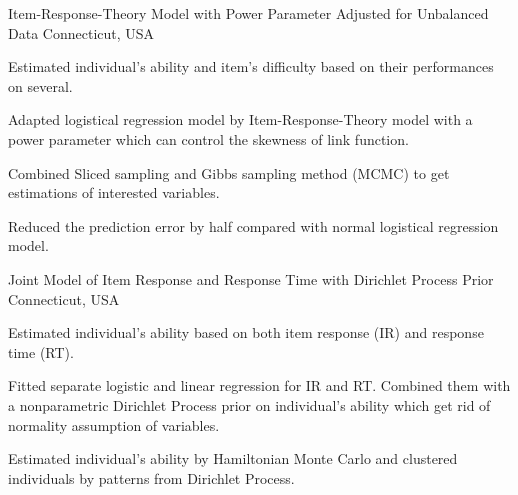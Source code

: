 

\begin{cventries}

  \cventry
    {} %
    {Item-Response-Theory Model with Power Parameter Adjusted for Unbalanced Data} %
    {Connecticut, USA} %
    {} %
    {
      \begin{cvitems} %
        \item {Estimated individual’s ability and item’s difficulty based on their performances on several.}
        \item {Adapted logistical regression model by Item-Response-Theory model with a power parameter which can control the skewness of link function.}
        \item {Combined Sliced sampling and Gibbs sampling method (MCMC) to get estimations of interested variables.}
        \item {Reduced the prediction error by half compared with normal logistical regression model.}
      \end{cvitems}
    }

  \cventry
    {} %
    {Joint Model of Item Response and Response Time with Dirichlet Process Prior} %
    {Connecticut, USA} %
    {} %
    {
      \begin{cvitems} %
        \item {Estimated individual’s ability based on both item response (IR) and response time (RT). }
        \item {Fitted separate logistic and linear regression for IR and RT. Combined them with a nonparametric Dirichlet Process prior on individual’s ability which get rid of normality assumption of variables.}
        \item {Estimated individual’s ability by Hamiltonian Monte Carlo and clustered individuals by patterns from Dirichlet Process.}
      \end{cvitems}
    }



\end{cventries}
